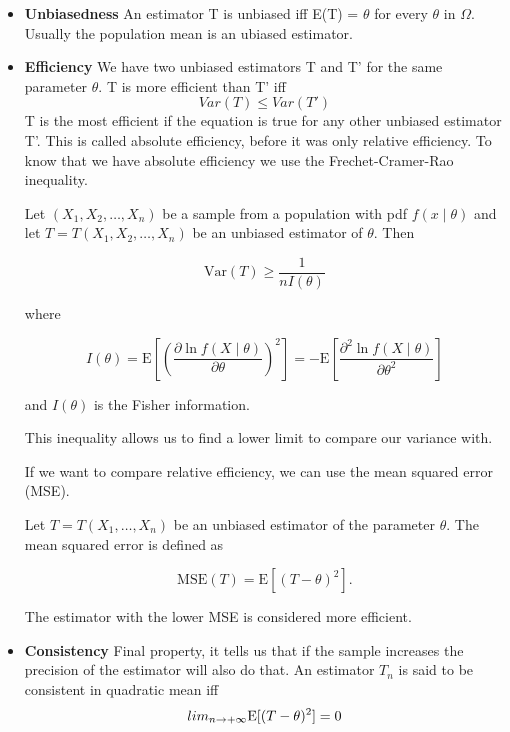 \begin{itemize}
    \item \textbf{Unbiasedness} \ra An estimator T is unbiased iff E(T) = $\theta$ for every $\theta$ in $\Omega$. Usually the population mean is an ubiased estimator.
    \item \textbf{Efficiency} \ra We have two unbiased estimators T and T' for the same parameter $\theta$. T is more efficient than T' iff
    \begin{equation}
        Var(T) \le Var(T')
    \end{equation}
    T is the most efficient if the equation is true for any other unbiased estimator T'.
    This is called absolute efficiency, before it was only relative efficiency.
    To know that we have absolute efficiency we use the Frechet-Cramer-Rao inequality.

    Let $(X_1, X_2, \dots, X_n)$ be a sample from a population with pdf $f(x \mid \theta)$ and let
$T = T(X_1, X_2, \dots, X_n)$ be an unbiased estimator of $\theta$. Then

\[
\mathrm{Var}(T) \geq \frac{1}{n I(\theta)}
\]

where

\[
I(\theta) = \mathrm{E} \left[ \left( \frac{\partial \ln f(X \mid \theta)}{\partial \theta} \right)^2 \right]
= - \mathrm{E} \left[ \frac{\partial^2 \ln f(X \mid \theta)}{\partial \theta^2} \right]
\]

and $I(\theta)$ is the Fisher information.
\vspace{10pt}

This inequality allows us to find a lower limit to compare our variance with. 

\vspace{10pt}

If we want to compare relative efficiency, we can use the mean squared error (MSE). 

Let $T = T(X_1, \dots, X_n)$ be an unbiased estimator of the parameter $\theta$. The mean squared error is defined as

\begin{equation}
    \mathrm{MSE}(T) = \mathrm{E}[(T - \theta)^2].
\end{equation}

The estimator with the lower MSE is considered more efficient.

\item \textbf{Consistency} \ra Final property, it tells us that if the sample increases the precision of the estimator will also do that. An estimator $T_n$ is said to be consistent in quadratic mean iff 
\begin{equation}
    lim_{n \rightarrow + \infty} \mathrm{E}[(T - \theta)^2] = 0
\end{equation}

\end{itemize}
